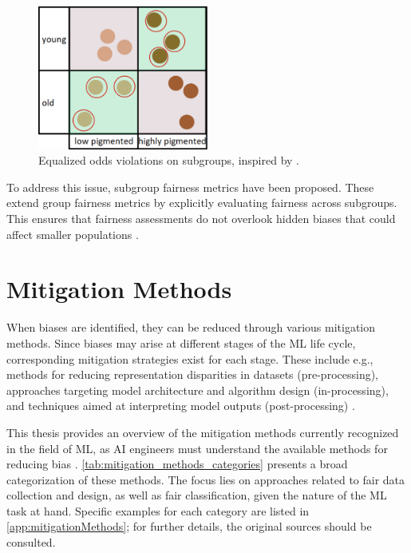 \documentclass[12pt, a4paper, oneside]{book}   	%
\begin{document}
		\begin{figure}[H]
			\centering
			\includegraphics[width=0.5\textwidth]{figures/EqualizedOddsSubgroupsIssueIllustration.png}
			\caption{Equalized odds violations on subgroups, inspired by \textcite{M80_Kearns_2019}.}
			\label{fig:eqOddsLimits}
		\end{figure}
		
		To address this issue, subgroup fairness metrics have been proposed. These extend group fairness metrics by explicitly evaluating fairness across subgroups. This ensures that fairness assessments do not overlook hidden biases that could affect smaller populations \autocite{M79_Kearns_2018,M80_Kearns_2019}.
		
			
		\section{Mitigation Methods} \label{chap:mitigationMethods}
			When biases are identified, they can be reduced through various mitigation methods. Since biases may arise at different stages of the \gls{ML} life cycle, corresponding mitigation strategies exist for each stage. These include e.g., methods for reducing representation disparities in datasets (pre-processing), approaches targeting model architecture and algorithm design (in-processing), and techniques aimed at interpreting model outputs (post-processing) \autocite{Mehrabi_2021}.
			
			This thesis provides an overview of the mitigation methods currently recognized in the field of \gls{ML}, as AI engineers must understand the available methods for reducing bias \autocite{Mehrabi_2021}. \autoref{tab:mitigation_methods_categories} presents a broad categorization of these methods. The focus lies on approaches related to fair data collection and design, as well as fair classification, given the nature of the \gls{ML} task at hand. Specific examples for each category are listed in \autoref{app:mitigationMethods}; for further details, the original sources should be consulted.
			
\end{document}
